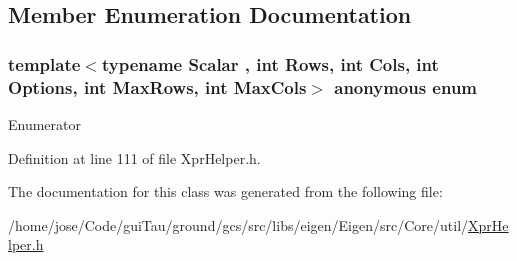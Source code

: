 \subsection{Member Enumeration Documentation}
\hypertarget{classei__compute__matrix__flags_a35e3b106e71e95760645093395a83c1a}{\subsubsection[{anonymous enum}]{\setlength{\rightskip}{0pt plus 5cm}template$<$typename Scalar , int Rows, int Cols, int Options, int Max\-Rows, int Max\-Cols$>$ anonymous enum}}\label{classei__compute__matrix__flags_a35e3b106e71e95760645093395a83c1a}
\begin{Desc}
\item[Enumerator]\par
\begin{description}
\item[{\em 
\hypertarget{classei__compute__matrix__flags_a35e3b106e71e95760645093395a83c1aabf654660b4e3fc26955faf6a11f0c642}{ret}\label{classei__compute__matrix__flags_a35e3b106e71e95760645093395a83c1aabf654660b4e3fc26955faf6a11f0c642}
}]\end{description}
\end{Desc}


Definition at line 111 of file Xpr\-Helper.\-h.



The documentation for this class was generated from the following file\-:\begin{DoxyCompactItemize}
\item 
/home/jose/\-Code/gui\-Tau/ground/gcs/src/libs/eigen/\-Eigen/src/\-Core/util/\hyperlink{_xpr_helper_8h}{Xpr\-Helper.\-h}\end{DoxyCompactItemize}
